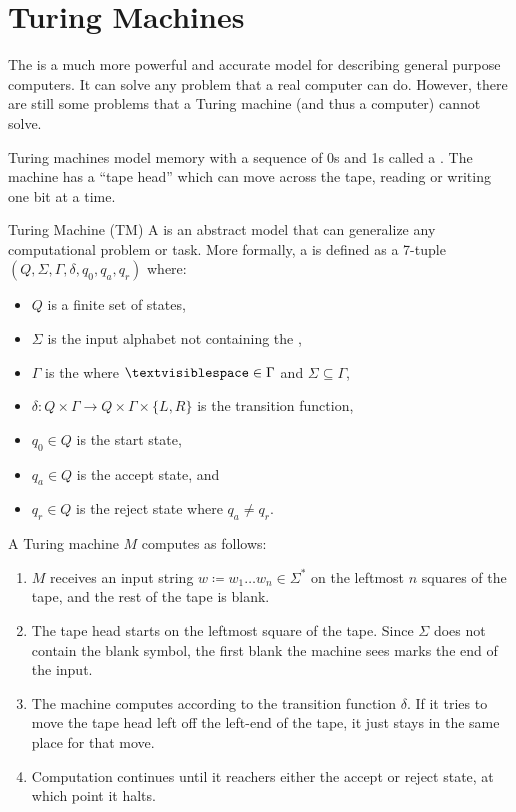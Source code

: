 \chapter{Turing Machines}

The  is a much more powerful and accurate model for describing general purpose computers. It can solve any problem that a real computer can do. However, there are still some problems that a Turing machine (and thus a computer) cannot solve.

Turing machines model memory with a sequence of 0s and 1s called a . The machine has a ``tape head'' which can move across the tape, reading or writing one bit at a time.

\begin{dfnbox}{Turing Machine (TM)}{}
    A  is an abstract model that can generalize any computational problem or task.
    \tcblower
    More formally, a  is defined as a 7-tuple $(Q, \Sigma, \Gamma, \delta, q_0, q_a, q_r)$ where:
    \begin{itemize}[noitemsep]
        \item $Q$ is a finite set of states,
        \item $\Sigma$ is the input alphabet not containing the  \textvisiblespace,
        \item $\Gamma$ is the  where $\textvisiblespace \in \Gamma$ and $\Sigma \subseteq \Gamma$,
        \item $\delta : Q \times \Gamma \to Q \times \Gamma \times \{L, R\}$ is the transition function,
        \item  $q_0 \in Q$ is the start state,
        \item $q_a \in Q$ is the accept state, and
        \item $q_r \in Q$ is the reject state where $q_a \neq q_r$.
    \end{itemize}
\end{dfnbox}

A Turing machine $M$ computes as follows:
\begin{enumerate}
    \item $M$ receives an input string $w \coloneq w_1 \ldots w_n \in \Sigma^*$ on the leftmost $n$ squares of the tape, and the rest of the tape is blank.
    \item The tape head starts on the leftmost square of the tape. Since $\Sigma$ does not contain the blank symbol, the first blank the machine sees marks the end of the input.
    \item The machine computes according to the transition function $\delta$. If it tries to move the tape head left off the left-end of the tape, it just stays in the same place for that move.
    \item Computation continues until it reachers either the accept or reject state, at which point it halts.
\end{enumerate}

